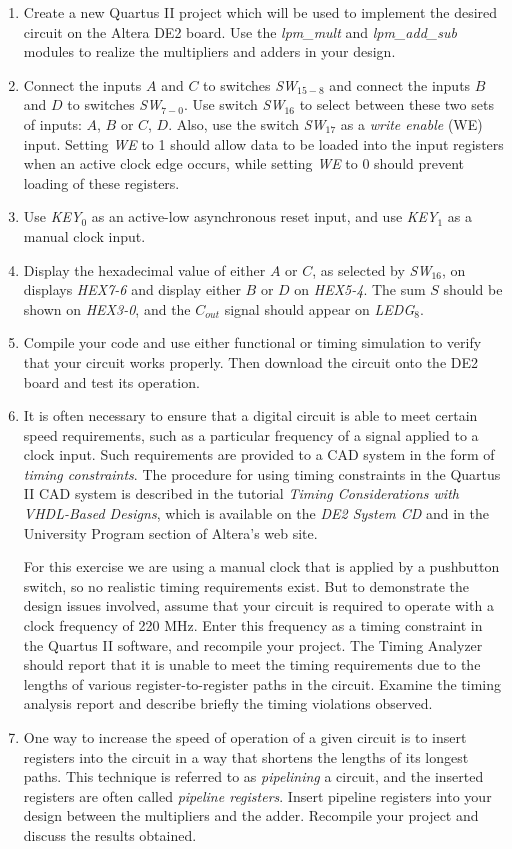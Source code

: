 \documentclass[psfig,10pt,fullpage]{article}
\begin{document}
\begin{enumerate}
\item Create a new Quartus II project which will be used to implement the desired
circuit on the Altera DE2 board. Use the {\it lpm\_mult} and {\it lpm\_add\_sub} modules
to realize the multipliers and adders in your design.
\item Connect the inputs $A$ and $C$ to switches {\it SW}$_{15-8}$ and 
connect the inputs $B$ and $D$ to switches {\it SW}$_{7-0}$. Use switch 
{\it SW}$_{16}$ to select between these two sets of inputs: $A$, $B$ or $C$, $D$. Also, use
the switch {\it SW}$_{17}$ as a {\it write enable} (WE) input. Setting {\it WE} to 1 should 
allow data to be loaded into the input registers when an active clock edge occurs, while 
setting {\it WE} to 0 should prevent loading of these registers.
\item Use {\it KEY}$_0$ as an active-low asynchronous reset
input, and use {\it KEY}$_1$ as a manual clock input. 
\item
Display the hexadecimal value of either $A$ or $C$, as selected by {\it SW}$_{16}$, 
on displays {\it HEX7-6} and display either $B$ or $D$ on {\it HEX5-4}. The sum $S$ should
be shown on {\it HEX3-0}, and the $C_{out}$ signal should appear on {\it LEDG}$_8$. 
\item Compile your code and use either functional or timing simulation to verify that 
your circuit works properly. Then download the circuit onto the DE2 board and test its
operation.
\item It is often necessary to ensure that a digital circuit is able to meet certain
speed requirements, such as a particular frequency of a signal applied to a clock input.
Such requirements
are provided to a CAD system in the form of {\it timing constraints}. The procedure for
using timing constraints in the Quartus II CAD system is described in the tutorial
{\it Timing Considerations with VHDL-Based Designs}, which is available 
on the {\it DE2 System CD} and in the University Program section of Altera's web site.  

For this exercise we are using a manual clock that is applied by a pushbutton switch,
so no realistic timing requirements exist. But to demonstrate the design issues
involved, assume that your circuit is required to operate with a clock frequency of 220
MHz. Enter this frequency as a timing constraint in the Quartus II software, and recompile
your project. The Timing Analyzer should report that it is unable to meet the timing
requirements due to the lengths of various register-to-register paths in the circuit. 
Examine the timing
analysis report and describe briefly the timing violations observed.
\item
One way to increase the speed of operation of a given circuit is to insert registers into the
circuit in a way that shortens the lengths of its longest paths. This technique is 
referred to as {\it pipelining} a circuit, and the inserted registers are often called
{\it pipeline registers}. Insert pipeline registers into your design between the
multipliers and the adder. Recompile your project and discuss the results obtained.
\end{enumerate}
\end{document}
